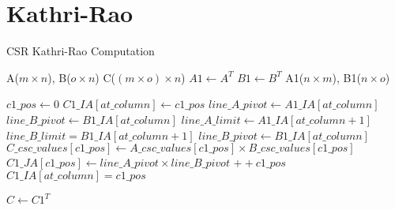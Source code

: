 \documentclass{article}
\begin{document}
\section{Kathri-Rao}
\begin{algorithm}
\caption{CSR Kathri-Rao Computation}\label{hada}
\begin{algorithmic}[1]

\Require A($m\times n$), B($o\times n$)
\Ensure C($(m\times o) \times n$)
\Statex
\State $A1 \gets A^{T}$
\State $B1 \gets B^{T}$
\Statex
\Require A1($n\times m$), B1($n\times o$)
\Statex

\State $c1\_pos \gets 0$
    \State $C1\_IA[at\_column] \gets c1\_pos$
    \State $line\_A\_pivot \gets A1\_IA[at\_column]$
    \State $line\_B\_pivot \gets B1\_IA[at\_column]$
    \State $line\_A\_limit \gets A1\_IA[at\_column+1]$
    \State $line\_B\_limit = B1\_IA[at\_column+1]$
    \Statex
		\State $line\_B\_pivot \gets B1\_IA[at\_column]$
			\State $C\_csc\_values[c1\_pos]  \gets A\_csc\_values[c1\_pos] \times B\_csc\_values[c1\_pos]$
			\State $C1\_JA[c1\_pos] \gets line\_A\_pivot \times line\_B\_pivot$
			\State $++c1\_pos$
		\EndFor
	\EndFor
\EndFor
\Statex
\State $C1\_IA[at\_column]=c1\_pos$

\Statex
\State $C \gets C1^{T}$

\end{algorithmic}
\end{algorithm}
\end{document}
